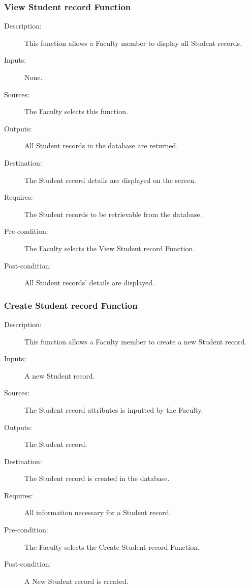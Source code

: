 \subsubsection{\large View Student record Function} 
\begin{boxed} %
\begin{description}
\item[Description:]
   This function allows a Faculty member to display all Student records.
\item[Inputs:]
   None.
\item[Sources:]
   The Faculty selects this function.
\item[Outputs:]
   All Student records in the database are returned.
\item[Destination:]
   The Student record details are displayed on the screen.
\item[Requires:]
   The Student records to be retrievable from the database.
\item[Pre-condition:]
   The Faculty selects the View Student record Function.
\item[Post-condition:]
   All Student records' details are displayed.
\end{description}
\end{boxed} %

\subsubsection{\large Create Student record Function} 
\begin{boxed} %
\begin{description}
\item[Description:]
   This function allows a Faculty member to create a new Student record.
\item[Inputs:]
   A new Student record.
\item[Sources:]
   The Student record attributes is inputted by the Faculty.
\item[Outputs:]
   The Student record.
\item[Destination:]
   The Student record is created in the database.
\item[Requires:]
   All information necessary for a Student record.
\item[Pre-condition:]
   The Faculty selects the Create Student record Function.
\item[Post-condition:]
   A New Student record is created.
\end{description}
\end{boxed} %

